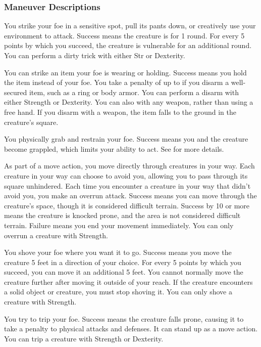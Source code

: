 \subsubsection{Maneuver Descriptions}

\label{Dirty Trick} You strike your foe in a sensitive spot, pull its pants down, or creatively use your environment to attack. Success means the creature is \vulnerable for 1 round. For every 5 points by which you succeed, the creature is vulnerable for an additional round. You can perform a dirty trick with either Str or Dexterity.

\label{Disarm} You can strike an item your foe is wearing or holding. Success means you hold the item instead of your foe. You take a penalty of up to  if you disarm a well-secured item, such as a ring or body armor. You can perform a disarm with either Strength or Dexterity. You can also with any weapon, rather than using a free hand. If you disarm with a weapon, the item falls to the ground in the creature's square.

\label{Grapple} You physically grab and restrain your foe. Success means you and the creature become grappled, which limits your ability to act. See  for more details.

\label{Overrun} As part of a move action, you move directly through creatures in your way. Each creature in your way can choose to avoid you, allowing you to pass through its square unhindered. Each time you encounter a creature in your way that didn't avoid you, you make an overrun attack. Success means you can move through the creature's space, though it is considered difficult terrain. Success by 10 or more means the creature is knocked prone, and the area is not considered difficult terrain. Failure means you end your movement immediately. You can only overrun a creature with Strength.

\label{Shove} You shove your foe where you want it to go. Success means you move the creature 5 feet in a direction of your choice. For every 5 points by which you succeed, you can move it an additional 5 feet. You cannot normally move the creature further after moving it outside of your reach. If the creature encounters a solid object or creature, you must stop shoving it. You can only shove a creature with Strength.

\label{Trip} You try to trip your foe. Success means the creature falls prone, causing it to take a  penalty to physical attacks and defenses. It can stand up as a move action. You can trip a creature with Strength or Dexterity.


